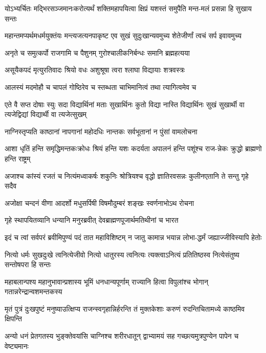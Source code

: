 \twolineshloka
{योऽभ्यर्चितः मद्भिरसञ्जमानःकरोत्यर्थं शक्तिमहापयित्वा}
{क्षिप्रं यशस्तं समुपैति मन्त-मलं प्रसन्ना हि सुखाय सन्तः}


\twolineshloka
{महान्तमप्यर्थमधर्मयुक्तंयः मन्त्यजत्यनपाकृष्ट एव}
{सुखं सुदुःखान्यवमुच्य शेतेजीर्णां त्वचं सर्प इवावमुच्य}


\twolineshloka
{अनृते च समुत्कर्पो राजगामि च पैशुनम्}
{गुरोश्चालीकनिर्बन्धः समानि ब्रह्महत्यया}


\twolineshloka
{असूयैकपदं मृत्युरतिवादः श्रियो वधः}
{अशुश्रूषा त्वरा श्लाघा विद्यायाः शत्रवस्त्रः}


\twolineshloka
{आलस्यं मदमोहौ च चापलं गोष्ठिरेव च}
{स्तब्धता चाभिमानित्वं तथा त्यागित्वमेव च}


\threelineshloka
{एते वै सप्त दोषाः स्युः सदा विद्यार्थिनां मताः}
{सुखार्थिनः कुतो विद्या नास्ति विद्यार्थिनः सुखं}
{सुखार्थी वा त्यजेद्विद्यां विद्यार्थी वा त्यजेत्सुखम्}


\twolineshloka
{नाग्निस्तृप्यति काष्ठानां नापगानां महोदधिः}
{नान्तकः सर्वभूतानां न पुंसां वामलोचना}


\twolineshloka
{आशा धृतिं हन्ति समृद्धिमन्तकःक्रोधः श्रियं हन्ति यशः कदर्यता}
{अपालनं हन्ति पशूंश्च राज-न्नेकः क्रुद्धो ब्राह्मणो हन्ति राष्ट्रम्}


\twolineshloka
{अजाश्च कांस्यं रजतं च नित्यंमध्वाकर्षः शकुनिः श्रोत्रियश्च}
{वृद्धो ज्ञातिरवसन्नः कुलीनएतानि ते सन्तु गृहे सदैव}


\twolineshloka
{अजोक्षा चन्दनं वीणा आदर्शो मधुसर्पिषी}
{विषमौदुम्बरं शङ्खः स्वर्णनाभोऽथ रोचना}


\twolineshloka
{गृहे स्थापयितव्यानि धन्यानि मनुरब्रवीत्}
{देवब्राह्मणपूजार्थमतिथीनां च भारत}


\twolineshloka
{इदं च त्वां सर्वपरं ब्रवीमिपुण्यं पदं तात महाविशिष्टम्}
{न जातु कामान्न भयान्न लोभा-द्धर्मं जह्याज्जीविस्यापि हेतोः}


\twolineshloka
{नित्यो धर्मः सुखदुःखे त्वनित्येजीवो नित्यो धातुरस्य त्वनित्यः}
{त्यक्त्वाऽनित्यं प्रतितिष्ठस्व नित्येसंतुष्य सन्तोषपरा हि सन्तः}


\threelineshloka
{महाबलान्पश्य महानुभावान्प्रशास्य भूमिं धनधान्यपूर्णाम्}
{राज्यानि हित्वा विपुलांश्च भोगान्}
{गतान्नरेन्द्रान्वशमन्तकस्य}


\twolineshloka
{मृतं पुत्रं दुःखपुष्टं मनुष्याउत्क्षिप्य राजन्स्वगृहान्निर्हरन्ति}
{तं मुक्तकेशाः करुणं रुदन्तिचितामध्ये काष्ठमिव क्षिपन्ति}


\twolineshloka
{अन्यो धनं प्रेतगतस्य भुङ्क्तेवयांसि चाग्निश्च शरीरधातून्}
{द्वाभ्यामयं सह गच्छत्यमुत्रपुण्येन पापेन च वेष्ट्यमानः}


